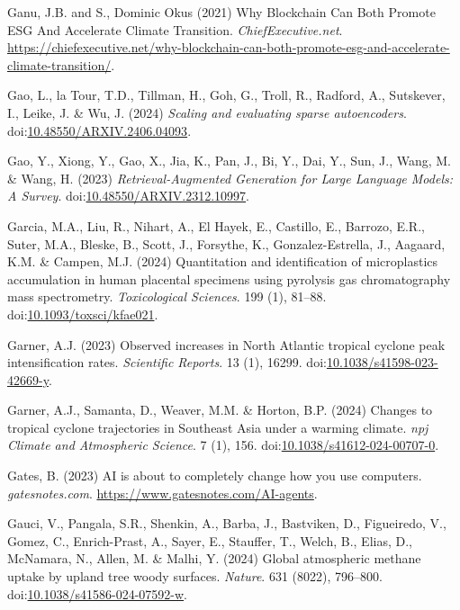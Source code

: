 \documentclass[
  letterpaper,
  DIV=11,
  numbers=noendperiod]{scrartcl}
\newlength{\cslhangindent}
\newenvironment{CSLReferences}[2] %
 {\begin{list}{}{%
  \setlength{\itemindent}{0pt}
  \setlength{\leftmargin}{0pt}
  \setlength{\parsep}{0pt}
  \ifodd #1
   \setlength{\leftmargin}{\cslhangindent}
   \setlength{\itemindent}{-1\cslhangindent}
  \fi
  \setlength{\itemsep}{#2\baselineskip}}}
 {\end{list}}
\begin{document}
\begin{CSLReferences}{0}{1}
Ganu, J.B. and S., Dominic Okus (2021) Why {Blockchain Can Both Promote
ESG And Accelerate Climate Transition}. \emph{ChiefExecutive.net}.
\url{https://chiefexecutive.net/why-blockchain-can-both-promote-esg-and-accelerate-climate-transition/}.

Gao, L., la Tour, T.D., Tillman, H., Goh, G., Troll, R., Radford, A.,
Sutskever, I., Leike, J. \& Wu, J. (2024) \emph{Scaling and evaluating
sparse autoencoders}.
doi:\href{https://doi.org/10.48550/ARXIV.2406.04093}{10.48550/ARXIV.2406.04093}.

Gao, Y., Xiong, Y., Gao, X., Jia, K., Pan, J., Bi, Y., Dai, Y., Sun, J.,
Wang, M. \& Wang, H. (2023) \emph{Retrieval-{Augmented Generation} for
{Large Language Models}: {A Survey}}.
doi:\href{https://doi.org/10.48550/ARXIV.2312.10997}{10.48550/ARXIV.2312.10997}.

Garcia, M.A., Liu, R., Nihart, A., El Hayek, E., Castillo, E., Barrozo,
E.R., Suter, M.A., Bleske, B., Scott, J., Forsythe, K.,
Gonzalez-Estrella, J., Aagaard, K.M. \& Campen, M.J. (2024) Quantitation
and identification of microplastics accumulation in human placental
specimens using pyrolysis gas chromatography mass spectrometry.
\emph{Toxicological Sciences}. 199 (1), 81--88.
doi:\href{https://doi.org/10.1093/toxsci/kfae021}{10.1093/toxsci/kfae021}.

Garner, A.J. (2023) Observed increases in {North Atlantic} tropical
cyclone peak intensification rates. \emph{Scientific Reports}. 13 (1),
16299.
doi:\href{https://doi.org/10.1038/s41598-023-42669-y}{10.1038/s41598-023-42669-y}.

Garner, A.J., Samanta, D., Weaver, M.M. \& Horton, B.P. (2024) Changes
to tropical cyclone trajectories in {Southeast Asia} under a warming
climate. \emph{npj Climate and Atmospheric Science}. 7 (1), 156.
doi:\href{https://doi.org/10.1038/s41612-024-00707-0}{10.1038/s41612-024-00707-0}.

Gates, B. (2023) {AI} is about to completely change how you use
computers. \emph{gatesnotes.com}.
\url{https://www.gatesnotes.com/AI-agents}.

Gauci, V., Pangala, S.R., Shenkin, A., Barba, J., Bastviken, D.,
Figueiredo, V., Gomez, C., Enrich-Prast, A., Sayer, E., Stauffer, T.,
Welch, B., Elias, D., McNamara, N., Allen, M. \& Malhi, Y. (2024) Global
atmospheric methane uptake by upland tree woody surfaces. \emph{Nature}.
631 (8022), 796--800.
doi:\href{https://doi.org/10.1038/s41586-024-07592-w}{10.1038/s41586-024-07592-w}.


\end{CSLReferences}
\end{document}
